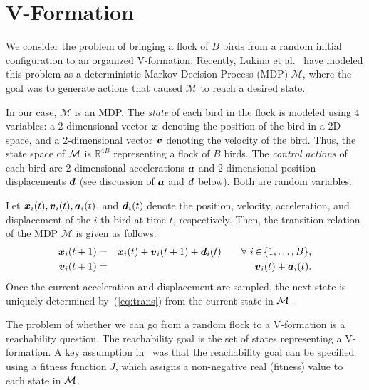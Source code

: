\section{V-Formation}
\label{sec:background}

We consider the problem of bringing a flock of $B$ birds from a random initial configuration to an organized V-formation.  Recently, Lukina et al.~\cite{lukina2016arxiv} have modeled this problem as a deterministic Markov Decision Process (MDP) $\mathcal{M}$, where the goal was to generate actions that caused $\mathcal{M}$ to reach a desired state. 

In our case, $\mathcal{M}$ is an MDP.  The \emph{state} of each bird in the flock is modeled using 4 variables: a 2-dimensional vector ${\boldsymbol {x}}$ denoting the position of the bird in a 2D space, and a 2-dimensional vector ${\boldsymbol {v}}$ denoting the velocity of the bird. Thus, the state space of ${\mathcal{M}}$ is $\mathbb{R}^{4B}$ representing a flock of $B$ birds.  The \emph{control actions} of each bird are 2-dimensional accelerations ${\boldsymbol {a}}$ and 2-dimensional position displacements ${\boldsymbol {d}}$ (see discussion of ${\boldsymbol {a}}$ and ${\boldsymbol {d}}$ below). Both are random variables.

Let ${\boldsymbol {x}}_i(t),{\boldsymbol {v}}_i(t),{\boldsymbol {a}}_i(t)$, and ${\boldsymbol {d}}_i(t)$ denote the position, velocity, acceleration, and displacement of the $i$-th bird at time $t$, respectively.
%
%
Then, the transition relation of the MDP $\mathcal{M}$ is given as follows:
%
\vspace*{-1mm}\begin{eqnarray}
\label{eq:trans}
 \xv_i(t + 1) &=& \xv_i(t) + \vv_i(t+1)\label{eq:x} + \vd_i(t) \qquad \forall~i\,{\in}\,\{1,\ldots,B\}, \nonumber\\
 \vv_i(t + 1) &=& \vv_i(t) + \va_i(t).\label{eq:v} %
\end{eqnarray}
%
Once the current acceleration and displacement are sampled, the next state is uniquely determined by~(\ref{eq:trans}) from the current state in ${\mathcal{M}}$~\cite{lukina2016arxiv}.

The problem of whether we can go from a random flock to a V-formation is a reachability question.  The reachability goal is the set of states representing a V-formation. A key assumption in~\cite{lukina2016arxiv} was that the reachability goal can be specified using a fitness function $J$,   
which assigns a non-negative real (fitness) value to each state in ${\mathcal{M}}$. 

